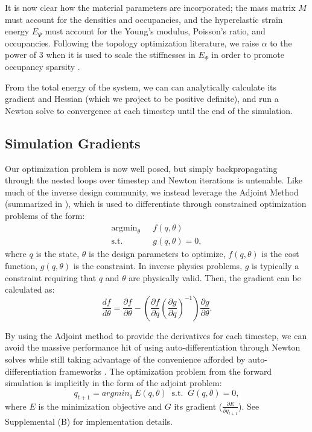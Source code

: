 It is now clear how the material parameters are incorporated; the mass matrix $M$ must account for the densities and occupancies, and the hyperelastic strain energy $E_\Psi$ must account for the Young's modulus, Poisson's ratio, and occupancies. Following the topology optimization literature, we raise $\alpha$ to the power of 3 when it is used to scale the stiffnesses in $E_\Psi$ in order to promote occupancy sparsity \cite{topology-opt-reference}.

From the total energy of the system, we can can analytically calculate its gradient and Hessian (which we project to be positive definite), and run a Newton solve to convergence at each timestep until the end of the simulation.

\subsection{Simulation Gradients}
Our optimization problem is now well posed, but simply backpropagating through the nested loops over timestep and Newton iterations is untenable. 
Like much of the inverse design community, we instead leverage the Adjoint Method (summarized in \cite{mcnamara2004fluid}), which is used to differentiate through constrained optimization problems of the form:
\begin{equation}
\begin{split}
	\mathop{\text{argmin}}_\theta & \text{ } f(q, \theta) \\
	\text{s.t.} & \text{ }g(q, \theta) = 0,
\end{split}
\end{equation}
where $q$ is the state, $\theta$ is the design parameters to optimize, $f(q, \theta)$ is the cost function, $g(q,\theta)$ is the constraint. In inverse physics problems, $g$ is typically a constraint requiring that $q$ and $\theta$ are physically valid. 
Then, the gradient can be calculated as:
\begin{equation}
\label{eq:adjoint-equation}
\frac{d f}{d \theta} = \frac{\partial f}{\partial \theta} - \left(\frac{\partial f}{\partial q} \left(\frac{\partial g}{\partial q}\right)^{-1} \right) \frac{\partial g}{\partial \theta}.
\end{equation}

By using the Adjoint method to provide the derivatives for each timestep, we can avoid the massive performance hit of using auto-differentiation through Newton solves while still taking advantage of the convenience afforded by auto-differentiation frameworks \cite{gradsim}. The optimization problem from the forward simulation is implicitly in the form of the adjoint problem:
$$ q_{t+1} = argmin_q \ E(q, \theta) \ \text{ s.t. }\ G(q, \theta) = 0, $$ 
where $E$ is the minimization objective and $G$ its gradient ($\frac{\partial E}{\partial q_{t+1}}$). See Supplemental (B) for implementation details.

